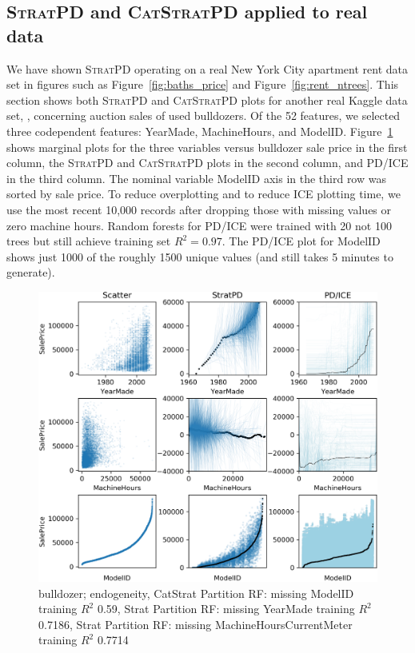 \documentclass[12pt]{article}
\newcommand{\figref}[1]{Figure~\ref{#1}}
\newcommand{\spd}{\fontfamily{cmr}\textsc{\small StratPD}}
\newcommand{\cspd}{\fontfamily{cmr}\textsc{\small CatStratPD}}
\begin{document}
\subsection{\spd{} and \cspd{} applied to real data} 

We have shown \spd{} operating on a real New York City apartment rent data set in figures such as \figref{fig:baths_price} and \figref{fig:rent_ntrees}.  This section shows both \spd{} and \cspd{} plots for another real Kaggle data set, \cite{bulldozer}, concerning auction sales of used bulldozers.  Of the 52 features, we selected three codependent features: YearMade, MachineHours, and ModelID. \figref{fig:bulldozer} shows marginal plots for the three variables versus bulldozer sale price in the first column, the \spd{} and \cspd{} plots in the second column, and PD/ICE in the third column. The nominal variable ModelID axis in the third row was sorted by sale price. To reduce overplotting and to reduce ICE plotting time, we use the most recent 10,000 records after dropping those with missing values or zero machine hours. Random forests for PD/ICE were trained with 20 not 100 trees but still achieve training set $R^2=0.97$. The  PD/ICE plot for ModelID shows just 1000 of the roughly 1500 unique values (and still takes 5 minutes to generate).

\begin{figure}[htbp]
\begin{center}
\includegraphics[scale=0.7]{images/bulldozer.png}
\caption{bulldozer; endogeneity, CatStrat Partition RF: missing ModelID training $R^2$ 0.59, Strat Partition RF: missing YearMade training $R^2$ 0.7186, Strat Partition RF: missing MachineHoursCurrentMeter training $R^2$ 0.7714}
\label{fig:bulldozer}
\end{center}
\end{figure}
\end{document}
